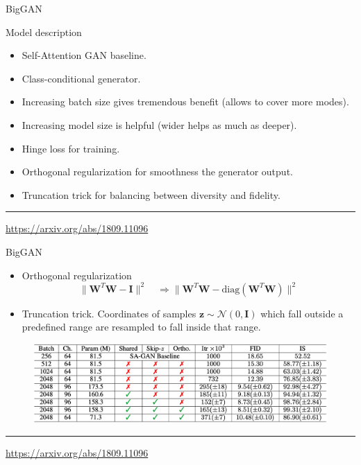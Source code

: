 \documentclass{beamer}
\newcommand{\bz}{\mathbf{z}}
\newcommand{\bI}{\mathbf{I}}
\newcommand{\bW}{\mathbf{W}}
\newcommand{\cN}{\mathcal{N}}
\begin{document}
\begin{frame}{BigGAN}
	\begin{block}{Model description}
		\begin{itemize}
			\item Self-Attention GAN baseline.
			\item Class-conditional generator.
			\item Increasing batch size gives tremendous benefit (allows to cover more modes).
			\item Increasing model size is helpful (wider helps as much as deeper).
			\item Hinge loss for training.
			\item Orthogonal regularization for smoothness the generator output.
			\item Truncation trick for balancing between diversity and fidelity.
		\end{itemize}
	\end{block}
	\vspace{0.5cm}

	\vfill
	\hrule\medskip 
	{\scriptsize \href{https://arxiv.org/abs/1809.11096}{https://arxiv.org/abs/1809.11096}}
\end{frame}
\begin{frame}{BigGAN}
	\begin{itemize}
		\item Orthogonal regularization
		\[
		\| \bW^T \bW - \bI \|^2 \quad \Rightarrow \| \bW^T \bW - \text{diag}(\bW^T \bW) \|^2
		\]
		\item Truncation trick. Coordinates of samples $\bz \sim \cN(0, \bI)$ which fall outside a predefined range are resampled to fall inside that range.
	\end{itemize}
	\begin{figure}
		\centering
		\includegraphics[width=\linewidth]{figs/biggan_results}
	\end{figure}
	\vfill
	\hrule\medskip 
	{\scriptsize \href{https://arxiv.org/abs/1809.11096}{https://arxiv.org/abs/1809.11096}}
\end{frame}
\end{document}
